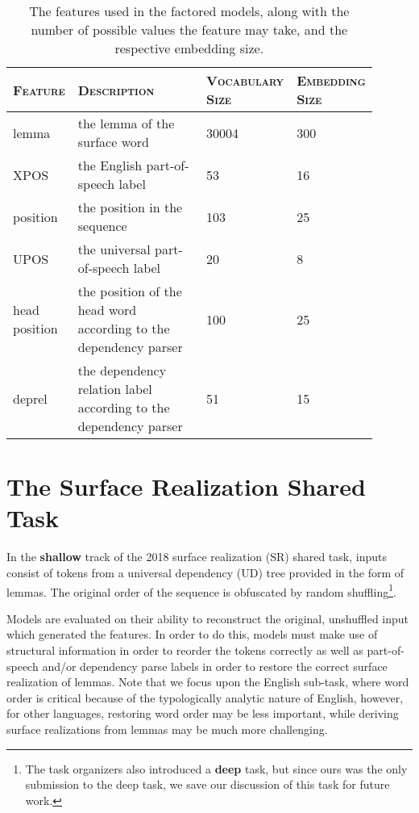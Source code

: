 \documentclass[11pt,a4paper]{article}
\begin{document}
\begin{table*}[ht!]
\centering
\begin{tabular}{p{0.15\linewidth}p{0.45\linewidth}p{0.15\linewidth}p{0.15\linewidth}}
\toprule
 \textsc{Feature} & \textsc{Description} & \textsc{Vocabulary Size} & \textsc{Embedding Size}  \\ \midrule
 lemma & the lemma of the surface word & 30004 & 300 \\
 XPOS & the English part-of-speech label & 53 & 16 \\
 position & the position in the sequence & 103 & 25 \\
 UPOS & the universal part-of-speech label & 20 & 8 \\
 head position & the position of the head word according to the dependency parser & 100 & 25 \\
 deprel & the dependency relation label according to the dependency parser & 51 & 15 \\
\bottomrule
\end{tabular}
\caption{The features used in the factored models, along with the number of possible values the feature may take, and the respective embedding size.}
\label{tab:features}
\end{table*}
\section{The Surface Realization Shared Task}

In the \textbf{shallow} track of the 2018 surface realization (SR) shared task, inputs consist of tokens from a universal dependency (UD) tree provided in the form of lemmas. The original order of the sequence is obfuscated by random shuffling\footnote{The task organizers also introduced a \textbf{deep} task, but since ours was the only submission to the deep task, we save our discussion of this task for future work.}.

Models are evaluated on their ability to reconstruct the original, unshuffled input which generated the features. In order to do this, models must make use of structural information in order to reorder the tokens correctly as well as part-of-speech and/or dependency parse labels in order to restore the correct surface realization of lemmas. Note that we focus upon the English sub-task, where word order is critical because of the typologically analytic nature of English, however, for other languages, restoring word order may be less important, while deriving surface realizations from lemmas may be much more challenging. 
\end{document}
